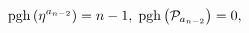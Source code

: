 \begin{equation}
\mathrm{pgh}\left( \eta ^{a_{n-2}}\right) =n-1,\;\mathrm{pgh}\left( \mathcal{%
P}_{a_{n-2}}\right) =0,  \label{f27}
\end{equation}

